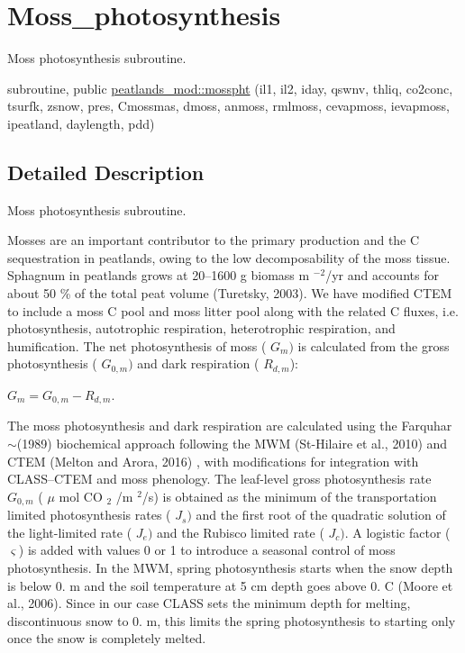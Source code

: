 \hypertarget{group__moss__photosynthesis}{}\section{Moss\+\_\+photosynthesis}
\label{group__moss__photosynthesis}


Moss photosynthesis subroutine.  


\begin{DoxyCompactItemize}
\item 
subroutine, public \hyperlink{group__moss__photosynthesis_ga74c6ae528153d57336622db389f4bdd3}{peatlands\+\_\+mod\+::mosspht} (il1, il2, iday, qswnv, thliq, co2conc, tsurfk, zsnow, pres, Cmossmas, dmoss, anmoss, rmlmoss, cevapmoss, ievapmoss, ipeatland, daylength, pdd)
\end{DoxyCompactItemize}


\subsection{Detailed Description}
Moss photosynthesis subroutine. 

Mosses are an important contributor to the primary production and the C sequestration in peatlands, owing to the low decomposability of the moss tissue. Sphagnum in peatlands grows at 20--1600 g biomass m $^{-2} $/yr and accounts for about 50 \% of the total peat volume (Turetsky, 2003). We have modified C\+T\+E\+M to include a moss C pool and moss litter pool along with the related C fluxes, i.\+e. photosynthesis, autotrophic respiration, heterotrophic respiration, and humification. The net photosynthesis of moss ( $G_m)$ is calculated from the gross photosynthesis ( $G_{0,m})$ and dark respiration ( $R_{d,m}$)\+:

$ G_m=G_{0,m}-R_{d,m} $.

The moss photosynthesis and dark respiration are calculated using the Farquhar$\sim$(1989) biochemical approach following the M\+W\+M (St-\/\+Hilaire et al., 2010) \cite{St-Hilaire2010-5e9} and C\+T\+E\+M (Melton and Arora, 2016) \cite{Melton2016-zx}, with modifications for integration with C\+L\+A\+S\+S--C\+T\+E\+M and moss phenology. The leaf-\/level gross photosynthesis rate $G_{0,m} $ ( $\mu $ mol C\+O $_2 $ /m $^2 $/s) is obtained as the minimum of the transportation limited photosynthesis rates ( $J_s)$ and the first root of the quadratic solution of the light-\/limited rate ( $J_e)$ and the Rubisco limited rate ( $J_c)$. A logistic factor ( $\varsigma$) is added with values 0 or 1 to introduce a seasonal control of moss photosynthesis. In the M\+W\+M, spring photosynthesis starts when the snow depth is below 0. m and the soil temperature at 5 cm depth goes above 0. C (Moore et al., 2006). Since in our case C\+L\+A\+S\+S sets the minimum depth for melting, discontinuous snow to 0. m, this limits the spring photosynthesis to starting only once the snow is completely melted.

